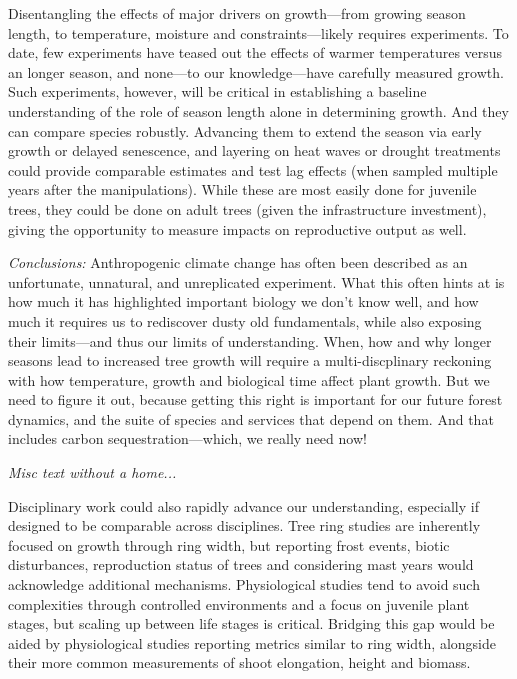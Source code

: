 \documentclass[11pt]{article}
\begin{document}
Disentangling the effects of major drivers on growth---from growing season length, to temperature, moisture and constraints---likely requires experiments. To date, few experiments have teased out the effects of warmer temperatures versus an longer season, and none---to our knowledge---have carefully measured growth. Such experiments, however, will be critical in establishing a baseline understanding of the role of season length alone in determining growth. And they can compare species robustly. Advancing them to extend the season via early growth or delayed senescence, and layering on heat waves or drought treatments could provide comparable estimates and test lag effects (when sampled multiple years after the manipulations). While these are most easily done for juvenile trees, they could be done on adult trees (given the infrastructure investment), giving the opportunity to measure impacts on reproductive output as well. 

\emph{Conclusions:}
Anthropogenic climate change has often been described as an unfortunate, unnatural, and unreplicated experiment. What this often hints at is how much it has highlighted important biology we don't know well, and how much it requires us to rediscover dusty old fundamentals, while also exposing their limits---and thus our limits of understanding. When, how and why longer seasons lead to increased tree growth will require a multi-discplinary reckoning with how temperature, growth and biological time affect plant growth. But we need to figure it out, because getting this right is important for our future forest dynamics, and the suite of species and services that depend on them. And that includes carbon sequestration---which, we really need now! 


\emph{Misc text without a home...}

Disciplinary work could also rapidly advance our understanding, especially if designed to be comparable across disciplines. Tree ring studies are inherently focused on growth through ring width, but reporting frost events, biotic disturbances, reproduction status of trees and considering mast years would acknowledge additional mechanisms. Physiological studies tend to avoid such complexities through controlled environments and a focus on juvenile plant stages, but scaling up between life stages is critical. Bridging this gap would be aided by physiological studies reporting metrics similar to ring width, alongside their more common measurements of shoot elongation, height and biomass. 
\end{document}
